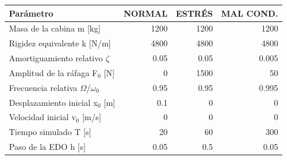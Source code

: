 {\footnotesize
\begin{longtable}{lrrr}
\toprule
\textbf{Parámetro} & \textbf{NORMAL} & \textbf{ESTRÉS} & \textbf{MAL COND.} \\
\midrule
\endhead
Masa de la cabina m [kg] & 1200 & 1200 & 1200 \\
Rigidez equivalente k [N/m] & 4800 & 4800 & 4800 \\
Amortiguamiento relativo $\zeta$ & 0.05 & 0.05 & 0.005 \\
Amplitud de la ráfaga F$_{0}$ [N] & 0 & 1500 & 50 \\
Frecuencia relativa $\Omega$/$\omega_{0}$ & 0.95 & 0.95 & 0.995 \\
Desplazamiento inicial x$_{0}$ [m] & 0.1 & 0 & 0 \\
Velocidad inicial v$_{0}$ [m/s] & 0 & 0 & 0 \\
Tiempo simulado T [s] & 20 & 60 & 300 \\
Paso de la EDO h [s] & 0.05 & 0.5 & 0.05 \\
\bottomrule
\end{longtable}
}
